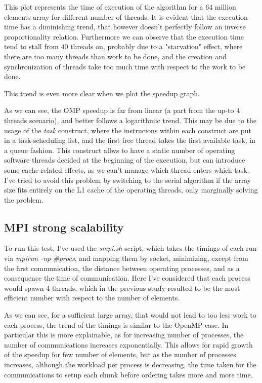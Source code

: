 \documentclass{article}
\begin{document}
	
	This plot represents the time of execution of the algorithm for a 64 million elements array for different number of threads.
	It is evident that the execution time has a diminishing trend, that however doesn't perfectly follow an inverse proportionality relation. Furthermore we can observe that the execution time tend to stall from $40$ threads on, probably due to a "starvation" effect, where there are too many threads than work to be done, and the creation and synchronization of threads take too much time with respect to the work to be done. 
	
	
	This trend is even more clear when we plot the speedup graph.
	
	
	As we can see, the OMP speedup is far from linear (a part from the up-to 4 threads scenario), and better follows a logarithmic trend. This may be due to the usage of the \textit{task} construct, where the instrucions within each construct are put in a task-scheduling list, and the first free thread takes the first available task, in a queue fashion. This construct allws to have a static number of operating software threads decided at the beginning of the execution, but can introduce some cache related effects, as we can't manage which thread enters which task. I've tried to avoid this problem by switching to the serial algorithm if the array size fits entirely on the L1 cache of the operating threads, only marginally solving the problem.
	
	\subsection{MPI strong scalability}
	
	To run this test, I've used the \textit{smpi.sh} script, which takes the timings of each run via \textit{mpirun -np \#procs}, and mapping them by socket, minimizing, except from the first communication, the distance between operating processes, and as a consequence the time of communication. Here I've considered that each process would spawn 4 threads, which in the previous study resulted to be the most efficient number with respect to the number of elements.
	
	
	As we can see, for a sufficient large array, that would not lead to too less work to each process, the trend of the timings is similar to the OpenMP case.
	In particular this is more explainable, as for increasing number of processes, the number of communications increases exponentially. This allows for rapid growth of the speedup for few number of elements, but as the number of processes increases, although the workload per process is decreasing, the time taken for the communications to setup each chunk before ordering takes more and more time.
	
\end{document}
